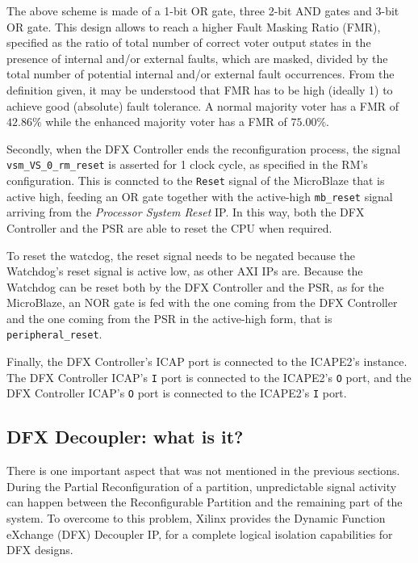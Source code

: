 The above scheme \cite{al} is made of a 1-bit OR gate, three 2-bit AND gates and 3-bit OR gate. This design allows to reach a higher Fault Masking Ratio (FMR), specified as the ratio of total number of correct voter output states in the presence of internal and/or external faults, which are masked, divided by the total number of potential internal and/or external fault occurrences. From the definition given, it may be understood that FMR has to be high (ideally 1) to achieve good (absolute) fault tolerance. A normal majority voter has a FMR of $42.86\%$ while the enhanced majority voter has a FMR of $75.00\%$.\bigskip

Secondly, when the DFX Controller ends the reconfiguration process, the signal \texttt{vsm\_VS\_0\_rm\_reset} is asserted for 1 clock cycle, as specified in the RM's configuration. This is conncted to the \texttt{Reset} signal of the MicroBlaze that is active high, feeding an OR gate together with the active-high \texttt{mb\_reset} signal arriving from the \textit{Processor System Reset} IP. In this way, both the DFX Controller and the PSR are able to reset the CPU when required. \bigskip

To reset the watcdog, the reset signal needs to be negated because the Watchdog's reset signal is active low, as other AXI IPs are. Because the Watchdog can be reset both by the DFX Controller and the PSR, as for the MicroBlaze, an NOR gate is fed with the one coming from the DFX Controller and the one coming from the PSR in the active-high form, that is \texttt{peripheral\_reset}.\bigskip

Finally, the DFX Controller's ICAP port is connected to the ICAPE2's instance. The DFX Controller ICAP's \texttt{I} port is connected to the ICAPE2's \texttt{O} port, and the DFX Controller ICAP's \texttt{O} port is connected to the ICAPE2's \texttt{I} port.



\subsection{DFX Decoupler: what is it?}
There is one important aspect that was not mentioned in the previous sections. During the Partial Reconfiguration of a partition, unpredictable signal activity can happen between the Reconfigurable Partition and the remaining part of the system. To overcome to this problem, Xilinx provides the Dynamic Function eXchange (DFX) Decoupler IP, for a complete logical isolation capabilities for DFX designs. \bigskip

